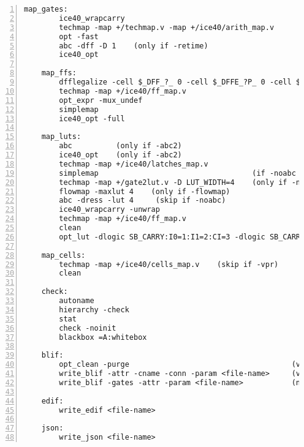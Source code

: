\begin{lstlisting}[numbers=left,frame=single]
    map_gates:
        ice40_wrapcarry
        techmap -map +/techmap.v -map +/ice40/arith_map.v
        opt -fast
        abc -dff -D 1    (only if -retime)
        ice40_opt

    map_ffs:
        dfflegalize -cell $_DFF_?_ 0 -cell $_DFFE_?P_ 0 -cell $_DFF_?P?_ 0 -cell $_DFFE_?P?P_ 0 -cell $_SDFF_?P?_ 0 -cell $_SDFFCE_?P?P_ 0 -cell $_DLATCH_?_ x -mince -1
        techmap -map +/ice40/ff_map.v
        opt_expr -mux_undef
        simplemap
        ice40_opt -full

    map_luts:
        abc          (only if -abc2)
        ice40_opt    (only if -abc2)
        techmap -map +/ice40/latches_map.v
        simplemap                                   (if -noabc or -flowmap)
        techmap -map +/gate2lut.v -D LUT_WIDTH=4    (only if -noabc)
        flowmap -maxlut 4    (only if -flowmap)
        abc -dress -lut 4     (skip if -noabc)
        ice40_wrapcarry -unwrap
        techmap -map +/ice40/ff_map.v
        clean
        opt_lut -dlogic SB_CARRY:I0=1:I1=2:CI=3 -dlogic SB_CARRY:CO=3

    map_cells:
        techmap -map +/ice40/cells_map.v    (skip if -vpr)
        clean

    check:
        autoname
        hierarchy -check
        stat
        check -noinit
        blackbox =A:whitebox

    blif:
        opt_clean -purge                                     (vpr mode)
        write_blif -attr -cname -conn -param <file-name>     (vpr mode)
        write_blif -gates -attr -param <file-name>           (non-vpr mode)

    edif:
        write_edif <file-name>

    json:
        write_json <file-name>
\end{lstlisting}

